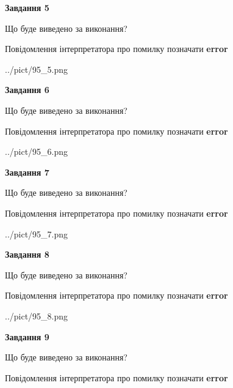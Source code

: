 \documentclass[11pt, ukrainian]{article}
\begin{document}
{\begin {large}
{\begin {center}\textbf{Завдання 5}\end {center}}\par
Що буде виведено за виконання? \par
Повідомлення інтерпретатора про помилку позначати \textbf{error}

\begin{center}
	{../pict/95_5.png}
\end{center}
\newpage

{\begin {center}\textbf{Завдання 6}\end {center}}\par
Що буде виведено за виконання? \par
Повідомлення інтерпретатора про помилку позначати \textbf{error}

\begin{center}
	{../pict/95_6.png}
\end{center}
\newpage

{\begin {center}\textbf{Завдання 7}\end {center}}\par
Що буде виведено за виконання? \par
Повідомлення інтерпретатора про помилку позначати \textbf{error}

\begin{center}
	{../pict/95_7.png}
\end{center}
\newpage

{\begin {center}\textbf{Завдання 8}\end {center}}\par
Що буде виведено за виконання? \par
Повідомлення інтерпретатора про помилку позначати \textbf{error}

\begin{center}
	{../pict/95_8.png}
\end{center}
\newpage

{\begin {center}\textbf{Завдання 9}\end {center}}\par
Що буде виведено за виконання? \par
Повідомлення інтерпретатора про помилку позначати \textbf{error}


\end{large}}
\end{document}
